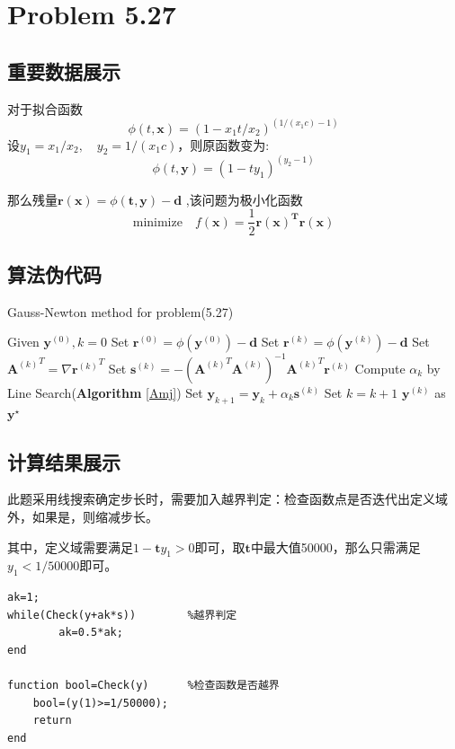 \newpage

\section{Problem 5.27}
\subsection{重要数据展示}
对于拟合函数
\[\phi(t,\bm{x})=(1-x_1t/x_2)^{(1/(x_1c)-1)}\]设$y_1=x_1/x_2,\quad y_2=1/(x_1c)$，则原函数变为:
\[\phi(t,\bm{y})=(1-ty_1)^{(y_2-1)}\]

那么残量$\bm{r(x)}=\phi(\bm{t},\bm{y})-\bm{d}$
,该问题为极小化函数
\begin{equation}
\text{minimize}\quad f(\bm{x})=\dfrac{1}{2}\bm{r(x)^Tr(x)}
\end{equation}

\subsection{算法伪代码}
\begin{algorithm}[h]  
\caption{Gauss-Newton method for problem(5.27)}  
\begin{algorithmic}[1]  
\STATE Given $\bm{y}^{(0)},k=0$ 
\STATE Set $\bm{r}^{(0)}=\phi(\bm{y}^{(0)})-\bm{d}$ 
\STATE Set $\bm{r}^{(k)}=\phi(\bm{y}^{(k)})-\bm{d}$
\STATE Set ${\bm{A}^{(k)}}^T=\nabla {\bm{r}^{(k)}}^T$
\STATE Set $\bm{s}^{(k)}=-({\bm{A}^{(k)}}^T{\bm{A}^{(k)}})^{-1}{\bm{A}^{(k)}}^T{\bm{r}^{(k)}}$
\STATE Compute $\alpha_k$ by Line Search(\textbf{Algorithm} \ref{Amj})
\STATE Set $\bm{y}_{k+1}=\bm{y}_{k}+\alpha_k\bm{s}^{(k)}$
\STATE Set $k=k+1$
\ENDWHILE
\RETURN $\bm{y}^{(k)}$ as $\bm{y}^{\star}$
\end{algorithmic}  
\end{algorithm}




\subsection{计算结果展示}
此题采用线搜索确定步长时，需要加入越界判定：检查函数点是否迭代出定义域外，如果是，则缩减步长。

其中，定义域需要满足$1-\bm{t}y_1>0$即可，取$\bm{t}$中最大值50000，那么只需满足$y_1<1/50000$即可。
\begin{lstlisting}
ak=1;
while(Check(y+ak*s))		%越界判定
		ak=0.5*ak;
end

function bool=Check(y)		%检查函数是否越界
    bool=(y(1)>=1/50000);
    return 
end
\end{lstlisting}


